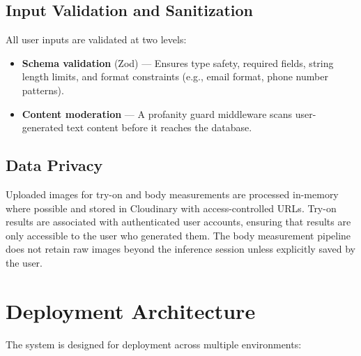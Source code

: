 \subsection{Input Validation and Sanitization}
All user inputs are validated at two levels:
\begin{itemize}[leftmargin=*]
    \item \textbf{Schema validation} (Zod) — Ensures type safety, required fields, string length limits, and format constraints (e.g., email format, phone number patterns).
    \item \textbf{Content moderation} — A profanity guard middleware scans user-generated text content before it reaches the database.
\end{itemize}

\subsection{Data Privacy}
Uploaded images for try-on and body measurements are processed in-memory where possible and stored in Cloudinary with access-controlled URLs. Try-on results are associated with authenticated user accounts, ensuring that results are only accessible to the user who generated them. The body measurement pipeline does not retain raw images beyond the inference session unless explicitly saved by the user.

\section{Deployment Architecture}

The system is designed for deployment across multiple environments:

